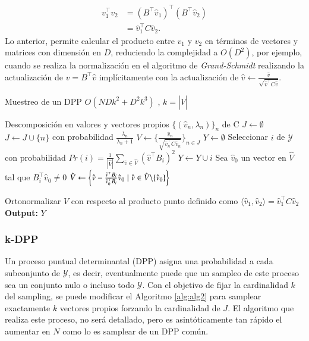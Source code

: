 \begin{align*}
    v_1^{\top}v_2 & = (B^{\top}\hat{v}_1)^{\top}(B^{\top}\hat{v}_2) \\
    & = \hat{v}_1^{\top}C\hat{v}_2.
\end{align*}
Lo anterior, permite calcular el producto entre $v_1$ y $v_2$ en términos de vectores y matrices con dimensión en $D$, reduciendo la complejidad a $O(D^2)$, por ejemplo, cuando se realiza la normalización en el algoritmo de \textit{Grand-Schmidt} realizando la actualización de $v = B^{\top}\hat{v}$ implícitamente con la actualización de $\hat{v} \gets \frac{\hat{v}}{\sqrt{\hat{v}^{\top}C\hat{v}}}$.

\begin{algorithm}
\caption{Muestreo de un DPP $O(NDk^2 + D^2k^3)$      , $k = |\hat{V}|$}\label{alg:alg2}
\begin{algorithmic}
\Require Descomposición en valores y vectores propios 
$\{(\hat{v}_n , \lambda_n)\}_{n}$ de C
\State $J \gets \emptyset$
\State $J \gets J \cup \{n\}$ con probabilidad $\frac{\lambda_n}{\lambda_n+1}$
\EndFor
\State $V \gets \{ \frac{\hat{v}_n}{\sqrt{\hat{v}_n^{\top} C \hat{v}_n}} \}_{n \in J}$
\State $Y \gets \emptyset$
\State Seleccionar $i$ de $\mathcal{Y}$ con probabilidad $Pr(i) = \frac{1}{|\hat{V}|}\sum_{\hat{v} \in \hat{V}}(\hat{v}^{\top}B_i)^2$ 
\State $Y \gets Y \cup i$
\State Sea $\hat{v}_0$ un vector en $\hat{V}$ tal que $B_i^{\top}\hat{v}_0 \neq 0$
\State $\hat{V} \gets \left \{\hat{v} - \frac{\hat{v}^{\top}B_i}{\hat{v}_0^{\top}B_i}\hat{v}_0 \hspace{0.1cm}| \hspace{0.1cm} \hat{v} \in \hat{V} \backslash \{\hat{v}_0\} \right \}$

\State Ortonormalizar $\hat{V}$ con respecto al producto punto definido como $\langle \hat{v}_1 , \hat{v}_2 \rangle = \hat{v}_1^{\top}C\hat{v}_2$
\EndWhile   
\State \textbf{Output: } $Y$
\end{algorithmic}
\end{algorithm}

\subsubsection{k-DPP}

Un proceso puntual determinantal (DPP) asigna una probabilidad a cada subconjunto de $\mathcal{Y}$, es decir, eventualmente puede que un sampleo de este proceso sea un conjunto nulo o incluso todo $\mathcal{Y}$. Con el objetivo de fijar la cardinalidad $k$ del sampling, se puede modificar el Algoritmo \ref{alg:alg2} para samplear exactamente $k$ vectores propios forzando la cardinalidad de $J$. 
El algoritmo que realiza este proceso, no será detallado, pero es asintóticamente tan rápido el aumentar en $N$ como lo es samplear de un DPP común. 


